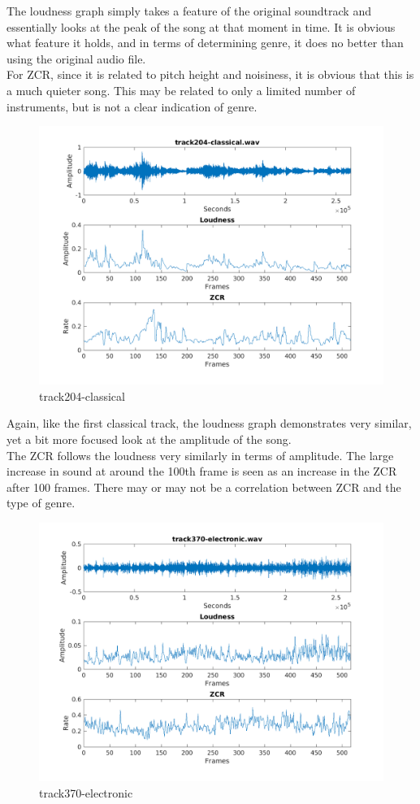 \documentclass[11pt, a4paper]{article}
\begin{document}
The loudness graph simply takes a feature of the original soundtrack and essentially looks at the peak of the song at that moment in time. It is obvious what feature it holds, and in terms of determining genre, it does no better than using the original audio file. \\

For ZCR, since it is related to pitch height and noisiness, it is obvious that this is a much quieter song. This may be related to only a limited number of instruments, but is not a clear indication of genre. \\

\begin{figure}[H]
    \centering
    \includegraphics[width=.8\textwidth]{track204-classical-timedomain.png}
    \caption{track204-classical}
\end{figure}

Again, like the first classical track, the loudness graph demonstrates very similar, yet a bit more focused look at the amplitude of the song. \\

The ZCR follows the loudness very similarly in terms of amplitude. The large increase in sound at around the 100th frame is seen as an increase in the ZCR after 100 frames. There may or may not be a correlation between ZCR and the type of genre.

\begin{figure}[H]
    \centering
    \includegraphics[width=.8\textwidth]{track370-electronic-timedomain.png}
    \caption{track370-electronic}
\end{figure}
\end{document}
